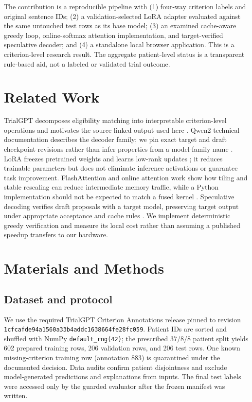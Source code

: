 ﻿\documentclass[conference]{IEEEtran}
\begin{document}
The contribution is a reproducible pipeline with (1) four-way criterion labels and original sentence IDs; (2) a validation-selected LoRA adapter evaluated against the same untouched test rows as its base model; (3) an examined cache-aware greedy loop, online-softmax attention implementation, and target-verified speculative decoder; and (4) a standalone local browser application. This is a criterion-level research result. The aggregate patient-level status is a transparent rule-based aid, not a labeled or validated trial outcome.

\section{Related Work}
TrialGPT decomposes eligibility matching into interpretable criterion-level operations and motivates the source-linked output used here \cite{jin2024trialgpt}. Qwen2 technical documentation describes the decoder family; we pin exact target and draft checkpoint revisions rather than infer properties from a model-family name \cite{qwen2024}. LoRA freezes pretrained weights and learns low-rank updates \cite{hu2021lora}; it reduces trainable parameters but does not eliminate inference activations or guarantee task improvement. FlashAttention and online attention work show how tiling and stable rescaling can reduce intermediate memory traffic, while a Python implementation should not be expected to match a fused kernel \cite{dao2022flash,rabe2022selfattention}. Speculative decoding verifies draft proposals with a target model, preserving target output under appropriate acceptance and cache rules \cite{leviathan2023speculative}. We implement deterministic greedy verification and measure its local cost rather than assuming a published speedup transfers to our hardware.

\section{Materials and Methods}
\subsection{Dataset and protocol}
We use the required TrialGPT Criterion Annotations release pinned to revision \texttt{1cfcafde94a1560a33b4addc1638664fe28fc059}. Patient IDs are sorted and shuffled with NumPy \texttt{default\_rng(42)}; the prescribed 37/8/8 patient split yields 602 prepared training rows, 206 validation rows, and 206 test rows. One known missing-criterion training row (annotation 883) is quarantined under the documented decision. Data audits confirm patient disjointness and exclude model-generated predictions and explanations from inputs. The final test labels were accessed only by the guarded evaluator after the frozen manifest was written.
\end{document}
